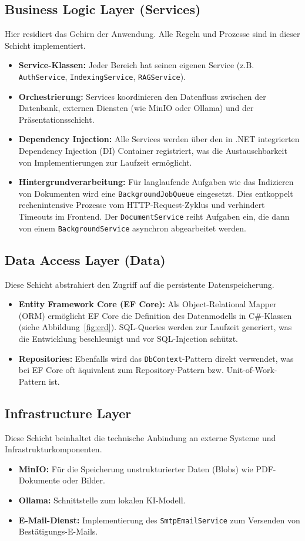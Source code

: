 \subsection{Business Logic Layer (Services)}
Hier residiert das \glqq{}Gehirn\grqq{} der Anwendung. Alle Regeln und Prozesse sind in dieser Schicht implementiert.
\begin{itemize}
    \item \textbf{Service-Klassen:} Jeder Bereich hat seinen eigenen Service (z.B. \texttt{AuthService}, \texttt{IndexingService}, \texttt{RAGService}).
    \item \textbf{Orchestrierung:} Services koordinieren den Datenfluss zwischen der Datenbank, externen Diensten (wie MinIO oder Ollama) und der Präsentationsschicht.
    \item \textbf{Dependency Injection:} Alle Services werden über den in .NET integrierten Dependency Injection (DI) Container registriert, was die Austauschbarkeit von Implementierungen zur Laufzeit ermöglicht.
    \item \textbf{Hintergrundverarbeitung:} Für langlaufende Aufgaben wie das Indizieren von Dokumenten wird eine \texttt{BackgroundJobQueue} eingesetzt. Dies entkoppelt rechenintensive Prozesse vom HTTP-Request-Zyklus und verhindert Timeouts im Frontend. Der \texttt{DocumentService} reiht Aufgaben ein, die dann von einem \texttt{BackgroundService} asynchron abgearbeitet werden.
\end{itemize}

\subsection{Data Access Layer (Data)}
Diese Schicht abstrahiert den Zugriff auf die persistente Datenspeicherung.
\begin{itemize}
    \item \textbf{Entity Framework Core (EF Core):} Als Object-Relational Mapper (ORM) \cite{efcore} ermöglicht EF Core die Definition des Datenmodells in C\#-Klassen (siehe Abbildung~\ref{fig:erd}). SQL-Queries werden zur Laufzeit generiert, was die Entwicklung beschleunigt und vor SQL-Injection schützt.
    \item \textbf{Repositories:} Ebenfalls wird das \texttt{DbContext}-Pattern direkt verwendet, was bei EF Core oft äquivalent zum Repository-Pattern bzw. Unit-of-Work-Pattern ist.
\end{itemize}

\subsection{Infrastructure Layer}
Diese Schicht beinhaltet die technische Anbindung an externe Systeme und Infrastrukturkomponenten.
\begin{itemize}
    \item \textbf{MinIO:} Für die Speicherung unstrukturierter Daten (Blobs) wie PDF-Dokumente oder Bilder.
    \item \textbf{Ollama:} Schnittstelle zum lokalen KI-Modell.
    \item \textbf{E-Mail-Dienst:} Implementierung des \texttt{SmtpEmailService} zum Versenden von Bestätigungs-E-Mails.
\end{itemize}

